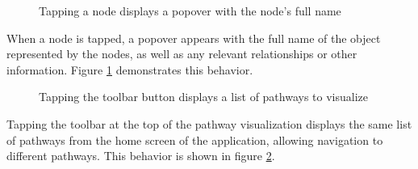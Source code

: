 \begin{figure}[hbtp]
    \caption{\label{fig:maw_screenshot_popover} Tapping a node displays a
    popover with the node's full name}
\end{figure}

When a node is tapped, a popover appears with the full name of the object
represented by the nodes, as well as any relevant relationships or other
information. Figure \ref{fig:maw_screenshot_popover} demonstrates this behavior.

\begin{figure}[hbtp]
    \caption{\label{fig:maw_screenshot_pathway_list_popover} Tapping the
    toolbar button displays a list of pathways to visualize}
\end{figure}

Tapping the toolbar at the top of the pathway visualization displays the same
list of pathways from the home screen of the application, allowing navigation to
different pathways. This behavior is shown in figure
\ref{fig:maw_screenshot_pathway_list_popover}.
